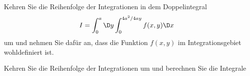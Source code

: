 \begin{atiTask}[
  title = Integrationsreihenfolge
]
\begin{atiSubtasks}
\item Kehren Sie die Reihenfolge der Integrationen in dem Doppelintegral
\begin{equation*}
I=\int_0^a \D y\int_0^{4a^2/4ay}f(x,y)\D x
\end{equation*}
um und nehmen Sie dafür an, dass die Funktion $f(x,y)$ im Integrationsgebiet wohldefiniert ist.

\item Kehren Sie die Reihenfolge der Integrationen um und berechnen Sie die Integrale
\begin{atiSubequations}
\item{}
\item{}
\end{atiSubequations}
\end{atiSubtasks}

\end{atiTask}